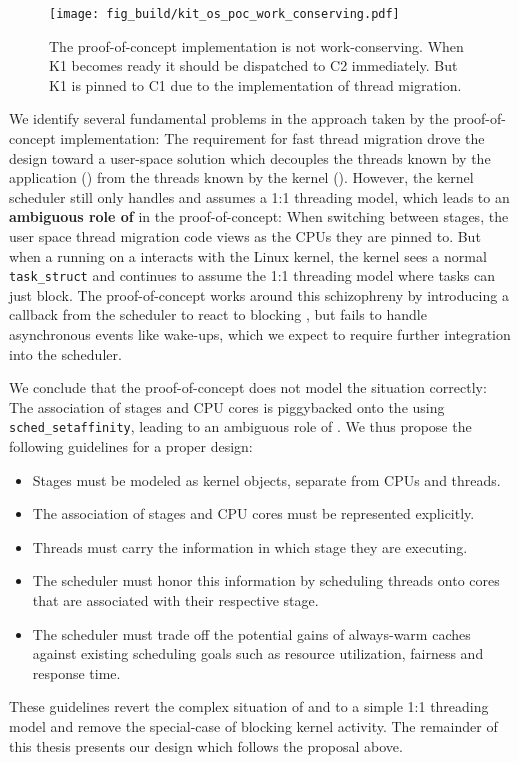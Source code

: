 \documentclass[12pt,a4paper]{book}
\begin{document}
\begin{figure}[h]
    \centering
    \texttt{[image: fig\_build/kit\_os\_poc\_work\_conserving.pdf]}
    \caption{The proof-of-concept implementation is not work-conserving. When K1 becomes ready it should be dispatched to C2 immediately. But K1 is pinned to C1 due to the implementation of thread migration.}
    \label{fig:kit_os_poc_work_conserving}
\end{figure}

We identify several fundamental problems in the approach taken by the proof-of-concept implementation:
The requirement for fast thread migration drove the design toward a user-space solution which decouples the threads known by the application (\ults) from the threads known by the kernel (\klts).
However, the kernel scheduler still only handles \klts and assumes a 1:1 threading model, which leads to an \textbf{ambiguous role of \klts} in the proof-of-concept:
When switching between stages, the user space thread migration code views \klts as the CPUs they are pinned to.
But when a \ult running on a \klt interacts with the Linux kernel, the kernel sees a normal \texttt{task\_struct} and continues to assume the 1:1 threading model where tasks can just block.
The proof-of-concept works around this schizophreny by introducing a callback from the scheduler to react to blocking \klts, but fails to handle asynchronous events like wake-ups, which we expect to require further integration into the scheduler.

We conclude that the proof-of-concept does not model the situation correctly:
The association of stages and CPU cores is piggybacked onto the \klts using \texttt{sched\_setaffinity}, leading to an ambiguous role of \klts.
We thus propose the following guidelines for a proper design:
\begin{itemize}%
    \item Stages must be modeled as kernel objects, separate from CPUs and threads.
    \item The association of stages and CPU cores must be represented explicitly.
    \item Threads must carry the information in which stage they are executing.
    \item The scheduler must honor this information by scheduling threads onto cores that are associated with their respective stage.
    \item The scheduler must trade off the potential gains of always-warm caches against existing scheduling goals such as resource utilization, fairness and response time.
\end{itemize}%
These guidelines revert the complex situation of \ults and \klts to a simple 1:1 threading model and remove the special-case of blocking kernel activity.
The remainder of this thesis presents our design which follows the proposal above.
\end{document}
